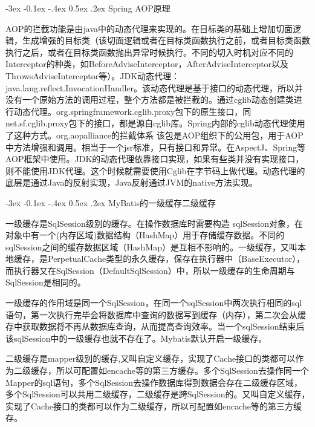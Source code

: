 \documentclass[8pt]{book}
\makeatletter
\numberwithin{dummy}{section}
\theoremstyle{ocrenumbox}
\theoremstyle{blacknumex}
\theoremstyle{blacknumbox}
\theoremstyle{ocrenum}
\renewcommand{\subsection}{\@startsection {subsection}{2}{\z@}
	{-3ex \@plus -0.1ex \@minus -.4ex}
	{0.5ex \@plus.2ex }
	{\normalfont\sffamily\bfseries}}
\makeatother
\begin{document}
\subsection{Spring AOP原理}

AOP的拦截功能是由java中的动态代理来实现的。在目标类的基础上增加切面逻辑，生成增强的目标类（该切面逻辑或者在目标类函数执行之前，或者目标类函数执行之后，或者在目标类函数抛出异常时候执行。不同的切入时机对应不同的Interceptor的种类，如BeforeAdviseInterceptor，AfterAdviseInterceptor以及ThrowsAdviseInterceptor等）。JDK动态代理：java.lang.reflect.InvocationHandler。该动态代理是基于接口的动态代理，所以并没有一个原始方法的调用过程，整个方法都是被拦截的。通过cglib动态创建类进行动态代理。org.springframework.cglib.proxy包下的原生接口，同net.sf.cglib.proxy包下的接口，都是源自cglib库。Spring内部的cglib动态代理使用了这种方式。org.aopalliance的拦截体系
该包是AOP组织下的公用包，用于AOP中方法增强和调用。相当于一个jsr标准，只有接口和异常。在AspectJ、Spring等AOP框架中使用。JDK的动态代理依靠接口实现，如果有些类并没有实现接口，则不能使用JDK代理。这个时候就需要使用Cglib在字节码上做代理。动态代理的底层是通过Java的反射实现，Java反射通过JVM的native方法实现。


\subsection{MyBatis的一级缓存二级缓存}

一级缓存是SqlSession级别的缓存。在操作数据库时需要构造 sqlSession对象，在对象中有一个(内存区域)数据结构（HashMap）用于存储缓存数据。不同的sqlSession之间的缓存数据区域（HashMap）是互相不影响的。一级缓存，又叫本地缓存，是PerpetualCache类型的永久缓存，保存在执行器中（BaseExecutor），而执行器又在SqlSession（DefaultSqlSession）中，所以一级缓存的生命周期与SqlSession是相同的。

一级缓存的作用域是同一个SqlSession，在同一个sqlSession中两次执行相同的sql语句，第一次执行完毕会将数据库中查询的数据写到缓存（内存），第二次会从缓存中获取数据将不再从数据库查询，从而提高查询效率。当一个sqlSession结束后该sqlSession中的一级缓存也就不存在了。Mybatis默认开启一级缓存。

二级缓存是mapper级别的缓存,又叫自定义缓存，实现了Cache接口的类都可以作为二级缓存，所以可配置如encache等的第三方缓存。多个SqlSession去操作同一个Mapper的sql语句，多个SqlSession去操作数据库得到数据会存在二级缓存区域，多个SqlSession可以共用二级缓存，二级缓存是跨SqlSession的。又叫自定义缓存，实现了Cache接口的类都可以作为二级缓存，所以可配置如encache等的第三方缓存。
\end{document}
